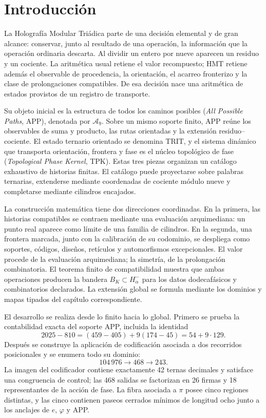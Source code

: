 \chapter*{Introducción}

La Holografía Modular Triádica parte de una decisión elemental y de gran
alcance: conservar, junto al resultado de una operación, la información que
la operación ordinaria descarta. Al dividir un entero por nueve aparecen un
residuo y un cociente. La aritmética usual retiene el valor recompuesto;
HMT retiene además el observable de procedencia, la orientación, el acarreo
fronterizo y la clase de prolongaciones compatibles. De esa decisión nace una
aritmética de estados provistos de un registro de transporte.

Su objeto inicial es la estructura de todos los caminos posibles
(\emph{All Possible Paths}, APP), denotada por \(\mathcal A_9\). Sobre un
mismo soporte finito, APP reúne los observables de suma y producto, las rutas
orientadas y la extensión residuo--cociente. El estado ternario orientado se
denomina TRIT, y el sistema dinámico que transporta orientación, frontera y
fase es el núcleo topológico de fase (\emph{Topological Phase Kernel}, TPK).
Estas tres piezas organizan un catálogo exhaustivo de historias finitas. El
catálogo puede proyectarse sobre palabras ternarias, extenderse mediante
coordenadas de cociente módulo nueve y completarse mediante cilindros encajados.

La construcción matemática tiene dos direcciones coordinadas. En la
primera, las historias compatibles se contraen mediante una evaluación
arquimediana: un punto real aparece como límite de una familia de cilindros.
En la segunda, una frontera marcada, junto con la calibración de su codominio,
se despliega como soportes, códigos, diseños, retículos y automorfismos
excepcionales. El valor procede de la evaluación arquimediana; la simetría,
de la prolongación combinatoria. El teorema finito de compatibilidad muestra
que ambas operaciones producen la bandera \(B_K\subset H^-_\alpha\) para los
datos dodecafásicos y combinatorios declarados. La extensión global se
formula mediante los dominios y mapas tipados del capítulo correspondiente.

El desarrollo se realiza desde lo finito hacia lo global. Primero se prueba
la contabilidad exacta del soporte APP, incluida la identidad
\[
2025-810=(459-405)+9(174-45)=54+9\cdot129.
\]
Después se construye la aplicación de codificación asociada a dos recorridos
posicionales y se enumera todo su dominio:
\[
104\,976\longrightarrow468\longrightarrow243.
\]
La imagen del codificador contiene exactamente 42 ternas decimales y satisface
una congruencia de control; las 468 salidas se factorizan en 26 firmas y 18 representantes de
la acción de fase. La fibra asociada a \(\pi\) posee cinco regiones
distintas, y las cinco contienen paseos cerrados mínimos de
longitud ocho junto a los anclajes de \(e\), \(\varphi\) y APP\@.

